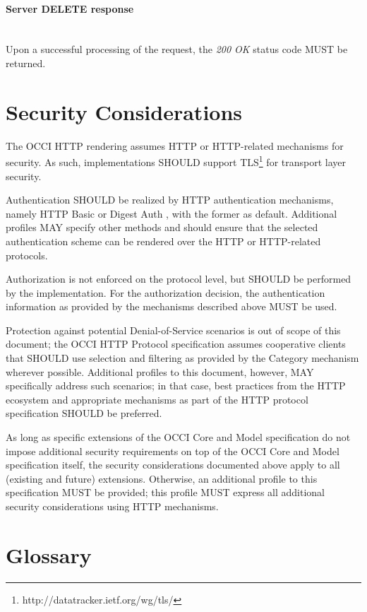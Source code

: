 \documentclass[10pt,a4paper]{article}
\begin{document}
\paragraph*{Server DELETE response}\hfill\\
Upon a successful processing of the request, the \emph{200 OK} status code MUST be returned.

\section{Security Considerations}
\label{sec:sec_consid}
The OCCI HTTP rendering assumes HTTP or HTTP-related mechanisms for
security. As such, implementations SHOULD support
TLS\footnote{http://datatracker.ietf.org/wg/tls/} for transport layer
security.

Authentication SHOULD be realized by HTTP authentication mechanisms,
namely HTTP Basic or Digest Auth \cite{rfc2617}, with the former as
default. Additional profiles MAY specify other methods and should
ensure that the selected authentication scheme can be rendered over
the HTTP or HTTP-related protocols.

Authorization is not enforced on the protocol level, but SHOULD be
performed by the implementation. For the authorization decision, the
authentication information as provided by the mechanisms described
above MUST be used.

Protection against potential Denial-of-Service scenarios is out of
scope of this document; the OCCI HTTP Protocol specification assumes
cooperative clients that SHOULD use selection and filtering as
provided by the Category mechanism wherever possible. Additional
profiles to this document, however, MAY specifically address such
scenarios; in that case, best practices from the HTTP ecosystem and
appropriate mechanisms as part of the HTTP protocol specification
SHOULD be preferred.

As long as specific extensions of the OCCI Core and Model
specification do not impose additional security requirements on top of the
OCCI Core and Model specification itself, the security considerations
documented above apply to all (existing and future)
extensions. Otherwise, an additional profile to this specification
MUST be provided; this profile MUST express all additional security
considerations using HTTP mechanisms.

\section{Glossary}
\label{sec:glossary}

\end{document}
